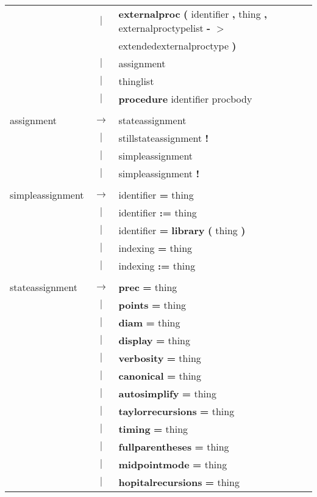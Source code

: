 \begin{tabular}{lcl}
 & $|$ & \textbf{externalproc} \textbf{(} identifier \textbf{,} thing \textbf{,} externalproctypelist \textbf{-} \textbf{$>$} \\
 & & extendedexternalproctype \textbf{)} \\
 & $|$ & assignment \\
 & $|$ & thinglist \\
 & $|$ & \textbf{procedure} identifier procbody \\
 & & \\
assignment & $\rightarrow$ & stateassignment \\
 & $|$ & stillstateassignment \textbf{!} \\
 & $|$ & simpleassignment \\
 & $|$ & simpleassignment \textbf{!} \\
 & & \\
simpleassignment & $\rightarrow$ & identifier \textbf{=} thing \\
 & $|$ & identifier \textbf{:=} thing \\
 & $|$ & identifier \textbf{=} \textbf{library} \textbf{(} thing \textbf{)} \\
 & $|$ & indexing \textbf{=} thing \\
 & $|$ & indexing \textbf{:=} thing \\
 & & \\
stateassignment & $\rightarrow$ & \textbf{prec} \textbf{=} thing \\
 & $|$ & \textbf{points} \textbf{=} thing \\
 & $|$ & \textbf{diam} \textbf{=} thing \\
 & $|$ & \textbf{display} \textbf{=} thing \\
 & $|$ & \textbf{verbosity} \textbf{=} thing \\
 & $|$ & \textbf{canonical} \textbf{=} thing \\
 & $|$ & \textbf{autosimplify} \textbf{=} thing \\
 & $|$ & \textbf{taylorrecursions} \textbf{=} thing \\
 & $|$ & \textbf{timing} \textbf{=} thing \\
 & $|$ & \textbf{fullparentheses} \textbf{=} thing \\
 & $|$ & \textbf{midpointmode} \textbf{=} thing \\
 & $|$ & \textbf{hopitalrecursions} \textbf{=} thing \\
 \end{tabular}\\

